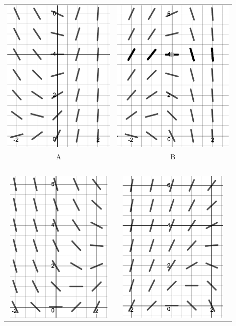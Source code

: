 \documentclass[addpoints,12pt]{exam}
\begin{document}
\begin{questions}
\begin{parts}
\begin{tabular}{c|c} \includegraphics[height=3in]{sf2} & 
 \includegraphics[height=3in]{sf1}\\
 A & B \\
 \hline
 ~\\
 \includegraphics[height=3in]{sf4}&
 \includegraphics[height=3in]{sf3}\\

\end{tabular}
\end{parts}
\end{questions}
\end{document}
